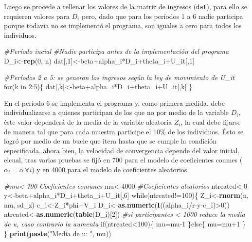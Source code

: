 \documentclass[]{article}
\newenvironment{Shaded}{\begin{snugshade}}{\end{snugshade}}
\newcommand{\KeywordTok}[1]{\textcolor[rgb]{0.13,0.29,0.53}{\textbf{{#1}}}}
\newcommand{\DecValTok}[1]{\textcolor[rgb]{0.00,0.00,0.81}{{#1}}}
\newcommand{\StringTok}[1]{\textcolor[rgb]{0.31,0.60,0.02}{{#1}}}
\newcommand{\CommentTok}[1]{\textcolor[rgb]{0.56,0.35,0.01}{\textit{{#1}}}}
\newcommand{\NormalTok}[1]{{#1}}
\begin{document}
Luego se procede a rellenar los valores de la matriz de ingresos
(\texttt{dat}), para ello se requieren valores para $D_{i}$ pero, dado
que para los períodos 1 a 6 nadie participa porque todavía no se
implementó el programa, son iguales a cero para todos los individuos.

\begin{Shaded}
\begin{Highlighting}[]
\CommentTok{#Período incial}
\CommentTok{#Nadie participa antes de la implementación del programa}
\NormalTok{D_i<-}\KeywordTok{rep}\NormalTok{(}\DecValTok{0}\NormalTok{, n)}
\NormalTok{dat[,}\DecValTok{1}\NormalTok{]<-beta+alpha_i*D_i+theta_i+U_it[,}\DecValTok{1}\NormalTok{]}

\CommentTok{#Períodos 2 a 5: se generan los ingresos según la ley de movimiento de U_it}
\NormalTok{for(k in }\DecValTok{2}\NormalTok{:}\DecValTok{5}\NormalTok{)\{}
  \NormalTok{dat[,k]<-beta+alpha_i*D_i+theta_i+U_it[,k]}
\NormalTok{\}}
\end{Highlighting}
\end{Shaded}

En el período 6 se implementa el programa y, como primera medida, debe
individualizarse a quienes participan de los que no por medio de la
variable $D_{i}$, éste valor dependerá de la media de la variable
aleatoria $Z_{i}$, la cual debe fijarse de manera tal que para cada
muestra participe el 10\% de los individuos. Ésto se logró por medio de
un bucle que itera hasta que se cumple la condición especificada, ahora
bien, la velocidad de convergencia depende del valor inicial, elcual,
tras varias pruebas se fijó en 700 para el modelo de coeficientes coumes
($\alpha_{i}=\alpha\, \forall i$) y en 4000 para el modelo de
coeficientes aleatorios.

\begin{Shaded}
\begin{Highlighting}[]
\CommentTok{#mu<-700 Coeficientes comunes}
\NormalTok{mu<-}\DecValTok{4000} \CommentTok{#Coeficientes aleatorios}
\NormalTok{ntreated<-}\DecValTok{0}
\NormalTok{y<-beta+alpha_i*D_i+theta_i+U_it[,}\DecValTok{6}\NormalTok{]}
\NormalTok{while(ntreated!=}\DecValTok{100}\NormalTok{)\{}
  \NormalTok{Z_i<-}\KeywordTok{rnorm}\NormalTok{(n, mu, sd_z)}
  \NormalTok{c_i<-Z_i*phi+V_i}
  \NormalTok{D_i<-}\KeywordTok{as.numeric}\NormalTok{(}\KeywordTok{I}\NormalTok{((alpha_i/r-y-c_i)>}\DecValTok{0}\NormalTok{))}
  \NormalTok{ntreated<-}\KeywordTok{as.numeric}\NormalTok{(}\KeywordTok{table}\NormalTok{(D_i)[}\DecValTok{2}\NormalTok{])}
  \CommentTok{#si participantes < 1000 reduce la media de u, caso contrario la aumenta}
  \NormalTok{if(ntreated<}\DecValTok{100}\NormalTok{)\{}
    \NormalTok{mu=mu}\DecValTok{-1}
  \NormalTok{\}else\{}
    \NormalTok{mu=mu}\DecValTok{+1}
  \NormalTok{\}}
\NormalTok{\}}
  \KeywordTok{print}\NormalTok{(}\KeywordTok{paste}\NormalTok{(}\StringTok{"Media de u: "}\NormalTok{, mu))}
\end{Highlighting}
\end{Shaded}
\end{document}
